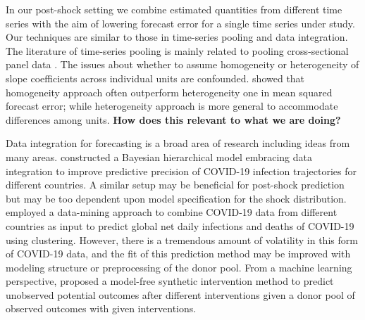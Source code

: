 \documentclass[11pt]{article}
\theoremstyle{definition}
\begin{document}

In our post-shock setting we combine estimated quantities from different time series with the aim of lowering forecast error for a single time series under study. Our techniques are similar to those in time-series pooling and data integration.  The literature of time-series pooling is mainly related to pooling cross-sectional panel data \citep{mundlak1978pooling, zellner1991forecasting, fosten2019panel}. The issues about whether to assume homogeneity or heterogeneity of slope coefficients across individual units are confounded. \citet{baltagi2008forecasting} showed that homogeneity approach often outperform  heterogeneity one in mean squared forecast error; while heterogeneity approach is more general to accommodate differences among units. \textbf{How does this relevant to what we are doing?}

Data integration for forecasting is a broad area of research including ideas from many areas. \citet{lee2020estimation} constructed a Bayesian hierarchical model embracing data integration %
to improve predictive precision of COVID-19 infection trajectories for different countries. A similar setup may be beneficial for post-shock prediction but may be too dependent upon model specification for the shock distribution.
\citet{plessen2020integrated} employed a data-mining approach to combine COVID-19 data from different countries as input to predict global net daily infections and deaths of COVID-19 using clustering. However, there is a tremendous amount of volatility in this form of COVID-19 data, and the fit of this prediction method may be improved with modeling structure or preprocessing of the donor pool. From a machine learning perspective, \citet{agarwal2020two} proposed a model-free synthetic intervention  method to predict unobserved potential outcomes after different interventions given a donor pool of observed outcomes with given interventions. 


\end{document}
